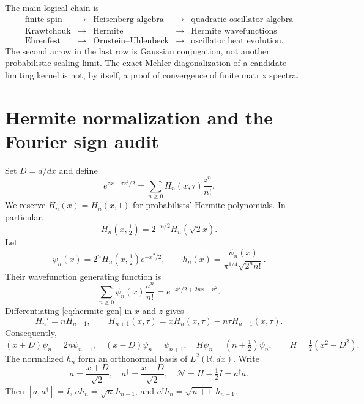 \documentclass[11pt,reqno]{amsart}
\theoremstyle{remark}\newtheorem{remark}[proposition]{Remark}
\newcommand{\R}{\mathbb R}\newcommand{\F}{\mathcal F}
\newcommand{\Id}{I}\newcommand{\NN}{\mathcal N}
\begin{document}
The main logical chain is
\[
\begin{array}{ccccc}
\text{finite spin}&\longrightarrow&\text{Heisenberg algebra}
 &\longrightarrow&\text{quadratic oscillator algebra}\\
\text{Krawtchouk}&\longrightarrow&\text{Hermite}
 &\longrightarrow&\text{Hermite wavefunctions}\\
\text{Ehrenfest}&\longrightarrow&\text{Ornstein--Uhlenbeck}
 &\longrightarrow&\text{oscillator heat evolution}.
\end{array}
\]
The second arrow in the last row is Gaussian conjugation, not another
probabilistic scaling limit. The exact Mehler diagonalization of a
candidate limiting kernel is not, by itself, a proof of convergence of
finite matrix spectra.

\section{Hermite normalization and the Fourier sign audit}\label{sec:hermite}
Set $D=d/dx$ and define
\begin{equation}\label{eq:hermite-gen}
 e^{zx-\tau z^2/2}=\sum_{n\ge0}H_n(x,\tau)\frac{z^n}{n!}.
\end{equation}
We reserve $H_n(x)=H_n(x,1)$ for probabilists' Hermite polynomials.
In particular,
\[
 H_n(x,\tfrac12)=2^{-n/2}H_n(\sqrt2x).
\]
Let
\[
 \psi_n(x)=2^nH_n(x,\tfrac12)e^{-x^2/2},\qquad
 h_n(x)=\frac{\psi_n(x)}{\pi^{1/4}\sqrt{2^nn!}}.
\]
Their wavefunction generating function is
\begin{equation}\label{eq:wave-gen}
 \sum_{n\ge0}\psi_n(x)\frac{u^n}{n!}
 =e^{-x^2/2+2ux-u^2}.
\end{equation}
Differentiating \eqref{eq:hermite-gen} in $x$ and $z$ gives
\[
 H_n'=nH_{n-1},\qquad
 H_{n+1}(x,\tau)=xH_n(x,\tau)-n\tau H_{n-1}(x,\tau).
\]
Consequently,
\begin{equation}\label{eq:ladder}
 (x+D)\psi_n=2n\psi_{n-1},\quad
 (x-D)\psi_n=\psi_{n+1},\quad
 H\psi_n=(n+\tfrac12)\psi_n,
 \qquad H=\tfrac12(x^2-D^2).
\end{equation}
The normalized $h_n$ form an orthonormal basis of $L^2(\R,dx)$.
Write
\[
 a=\frac{x+D}{\sqrt2},\quad a^\dagger=\frac{x-D}{\sqrt2},\quad
 \NN=H-\tfrac12\Id=a^\dagger a.
\]
Then $[a,a^\dagger]=\Id$, $ah_n=\sqrt n\,h_{n-1}$, and
$a^\dagger h_n=\sqrt{n+1}\,h_{n+1}$.
\end{document}
